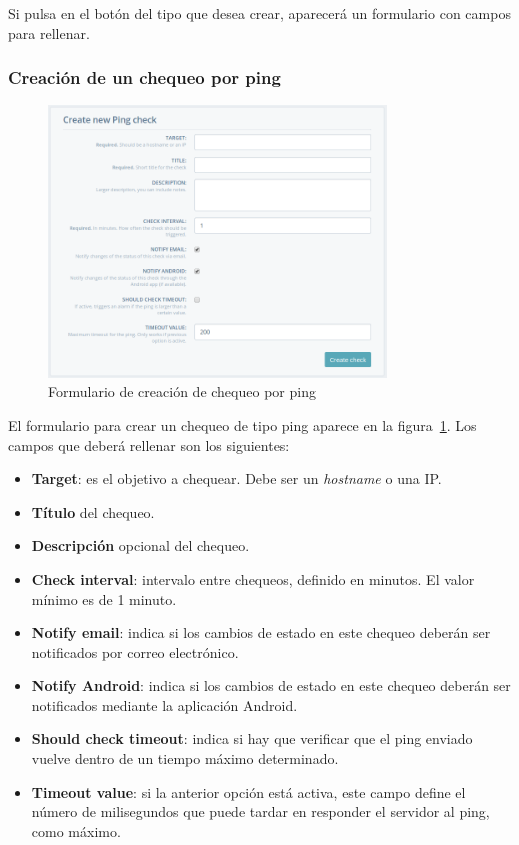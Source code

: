 Si pulsa en el botón del tipo que desea crear, aparecerá un formulario con
campos para rellenar.

\subsubsection{Creación de un chequeo por ping}

\begin{figure}[hbtp]
  \centering
  \includegraphics[width=0.8\textwidth]{apendice_manual_usuario/pantalla_crear_ping.png}
  \caption{Formulario de creación de chequeo por ping}
  \label{fig:crear-ping}
\end{figure}

El formulario para crear un chequeo de tipo ping aparece en la
figura~\ref{fig:crear-ping}. Los campos que deberá rellenar son los siguientes:

\begin{itemize}
\item \textbf{Target}: es el objetivo a chequear. Debe ser un \textit{hostname} o una IP.
\item \textbf{Título} del chequeo.
\item \textbf{Descripción} opcional del chequeo.
\item \textbf{Check interval}: intervalo entre chequeos, definido en minutos. El
  valor mínimo es de 1 minuto.
\item \textbf{Notify email}: indica si los cambios de estado en este chequeo
  deberán ser notificados por correo electrónico.
\item \textbf{Notify Android}: indica si los cambios de estado en este chequeo
  deberán ser notificados mediante la aplicación Android.
\item \textbf{Should check timeout}: indica si hay que verificar que el ping
  enviado vuelve dentro de un tiempo máximo determinado.
\item \textbf{Timeout value}: si la anterior opción está activa, este campo
  define el número de milisegundos que puede tardar en responder el servidor al
  ping, como máximo.
\end{itemize}

